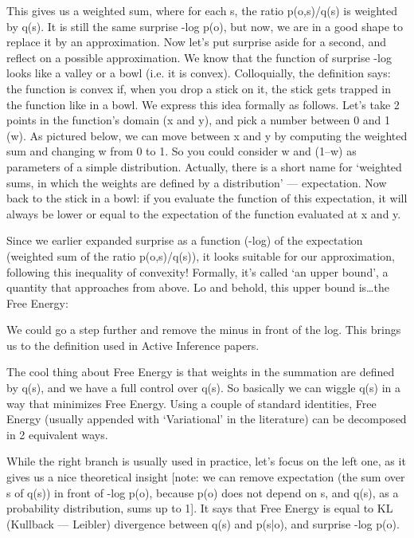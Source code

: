 \documentclass[12pt]{article}
\begin{document}
This gives us a weighted sum, where for each s, the ratio p(o,s)/q(s) is weighted by q(s). It is still the same surprise -log p(o), but now, we are in a good shape to replace it by an approximation.
Now let’s put surprise aside for a second, and reflect on a possible approximation. We know that the function of surprise -log looks like a valley or a bowl (i.e. it is convex). Colloquially, the definition says: the function is convex if, when you drop a stick on it, the stick gets trapped in the function like in a bowl. We express this idea formally as follows. Let’s take 2 points in the function’s domain (x and y), and pick a number between 0 and 1 (w). As pictured below, we can move between x and y by computing the weighted sum and changing w from 0 to 1. So you could consider w and (1–w) as parameters of a simple distribution. Actually, there is a short name for ‘weighted sums, in which the weights are defined by a distribution’ — expectation. Now back to the stick in a bowl: if you evaluate the function of this expectation, it will always be lower or equal to the expectation of the function evaluated at x and y.

Since we earlier expanded surprise as a function (-log) of the expectation (weighted sum of the ratio p(o,s)/q(s)), it looks suitable for our approximation, following this inequality of convexity! Formally, it’s called ‘an upper bound’, a quantity that approaches from above. Lo and behold, this upper bound is…the Free Energy:

We could go a step further and remove the minus in front of the log. This brings us to the definition used in Active Inference papers.

The cool thing about Free Energy is that weights in the summation are defined by q(s), and we have a full control over q(s). So basically we can wiggle q(s) in a way that minimizes Free Energy.
Using a couple of standard identities, Free Energy (usually appended with ‘Variational’ in the literature) can be decomposed in 2 equivalent ways.

While the right branch is usually used in practice, let’s focus on the left one, as it gives us a nice theoretical insight [note: we can remove expectation (the sum over s of q(s)) in front of -log p(o), because p(o) does not depend on s, and q(s), as a probability distribution, sums up to 1]. It says that Free Energy is equal to KL (Kullback — Leibler) divergence between q(s) and p(s|o), and surprise -log p(o).
\end{document}
